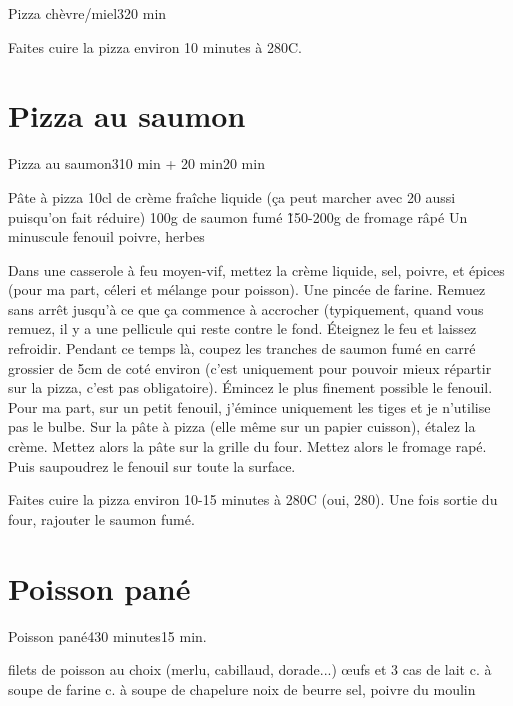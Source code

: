 {\begin{recette}{Pizza chèvre/miel}{3}{}{20 min}
\begin{cuisson}
Faites cuire la pizza environ 10 minutes à 280\degres C.
\end{cuisson}
\end{recette}

\section{Pizza au saumon}
\begin{recette}{Pizza au saumon}{3}{10 min + 20 min}{20 min}
\begin{ingredients}
\ingredient Pâte à pizza
\ingredient 10cl de crème fraîche liquide (ça peut marcher avec 20 aussi puisqu'on fait réduire)
\ingredient 100g de saumon fumé
\ingredient \~ 150-200g de fromage râpé
\ingredient Un minuscule fenouil
\ingredient poivre, herbes
\end{ingredients}

\begin{preparation}
\etape Dans une casserole à feu moyen-vif, mettez la crème liquide, sel, poivre, et épices (pour ma part, céleri et mélange 
pour poisson). Une pincée de farine. Remuez sans arrêt jusqu'à ce que ça commence à accrocher (typiquement, quand vous remuez, 
il y a une pellicule qui reste contre le fond. Éteignez le feu et laissez refroidir.
\etape Pendant ce temps là, coupez les tranches de saumon fumé en carré grossier de 5cm de coté environ (c'est uniquement pour pouvoir mieux répartir sur la pizza, c'est pas obligatoire).
\etape Émincez le plus finement possible le fenouil. Pour ma part, sur un petit fenouil, j'émince uniquement les tiges et je 
n'utilise pas le bulbe. 
\etape Sur la pâte à pizza (elle même sur un papier cuisson), étalez la crème. Mettez alors la pâte sur la grille du four.
\etape Mettez alors le fromage rapé. Puis saupoudrez le fenouil sur toute la surface.
\end{preparation}

\begin{cuisson}
Faites cuire la pizza environ 10-15 minutes à 280\degres C (oui, 280). Une fois sortie du four, rajouter le saumon fumé. 
\end{cuisson}
\end{recette}

\section{Poisson pané}
\begin{recette}{Poisson pané}{4}{30 minutes}{15 min.}
\begin{ingredients}
 filets de poisson au choix (merlu, cabillaud, dorade...)
 œufs et 3 cas de lait
 c. à soupe de farine
 c. à soupe de chapelure
 noix de beurre
\ingredient sel, poivre du moulin
\end{ingredients}


\end{recette}}
